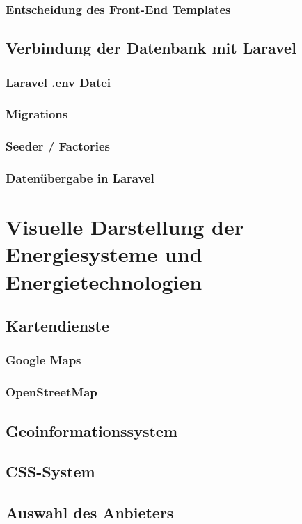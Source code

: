 \subsubsection{Entscheidung des Front-End Templates}
\subsection{Verbindung der Datenbank mit Laravel}
\subsubsection{Laravel .env Datei }
\subsubsection{Migrations}
\subsubsection{Seeder / Factories}
\subsubsection{Datenübergabe in Laravel}

\section {Visuelle Darstellung der Energiesysteme und Energietechnologien }
\subsection{Kartendienste}
\subsubsection{Google Maps}
\subsubsection{OpenStreetMap}
\subsection{Geoinformationssystem }
\subsection{CSS-System}
\subsection{Auswahl des Anbieters}

